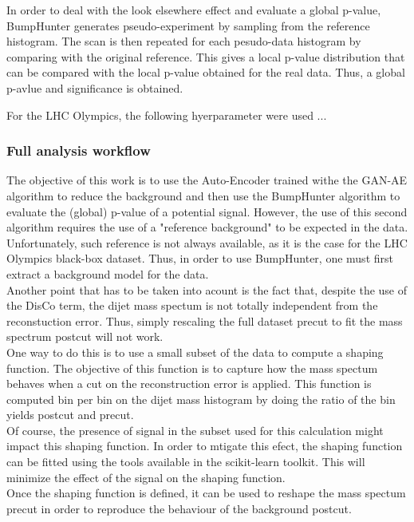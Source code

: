 \documentclass[letterpaper,11pt]{article}
\begin{document}
\noindent In order to deal with the look elsewhere effect and evaluate a global p-value, BumpHunter generates pseudo-experiment by sampling from the reference histogram.
The scan is then repeated for each pesudo-data histogram by comparing with the original reference.
This gives a local p-value distribution that can be compared with the local p-value obtained for the real data.
Thus, a global p-avlue and significance is obtained.

\noindent For the LHC Olympics, the following hyerparameter were used ...

\subsubsection{Full analysis workflow}

\noindent The objective of this work is to use the Auto-Encoder trained withe the GAN-AE algorithm to reduce the background and then use the BumpHunter algorithm to evaluate the (global) p-value of a potential signal.
However, the use of this second algorithm requires the use of a "reference background" to be expected in the data.
Unfortunately, such reference is not always available, as it is the case for the LHC Olympics black-box dataset.
Thus, in order to use BumpHunter, one must first extract a background model for the data.\\
Another point that has to be taken into acount is the fact that, despite the use of the DisCo term, the dijet mass spectum is not totally independent from the reconstuction error.
Thus, simply rescaling the full dataset precut to fit the mass spectrum postcut will not work. \\

\noindent One way to do this is to use a small subset of the data to compute a shaping function.
The objective of this function is to capture how the mass spectum behaves when a cut on the reconstruction error is applied.
This function is computed bin per bin on the dijet mass histogram by doing the ratio of the bin yields postcut and precut.\\
Of course, the presence of signal in the subset used for this calculation might impact this shaping function.
In order to mtigate this efect, the shaping function can be fitted using the tools available in the scikit-learn toolkit.
This will minimize the effect of the signal on the shaping function.\\
Once the shaping function is defined, it can be used to reshape the mass spectum precut in order to reproduce the behaviour of the background postcut.\\
\end{document}
